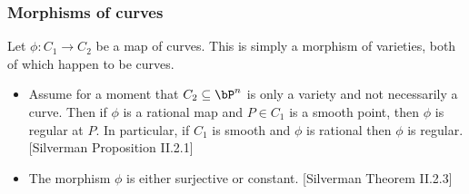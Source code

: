 	\bigskip

	\subsubsection{Morphisms of curves}
	Let $\phi:C_1\to C_2$ be a map of curves. This is simply a morphism of varieties, both of which happen to be curves.
	\begin{itemize}
		\item Assume for a moment that $C_2 \subseteq \bP^n$ is only a variety and not necessarily a curve. Then if $\phi$ is a rational map and $P \in C_1$ is a smooth point, then $\phi$ is regular at $P$. In particular, if $C_1$ is smooth and $\phi$ is rational then $\phi$ is regular. [Silverman Proposition II.2.1]
		\item The morphism $\phi$ is either surjective or constant. [Silverman Theorem II.2.3]
	\end{itemize}
	
	\bigskip

